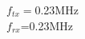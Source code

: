 \documentclass[preview]{standalone}
\begin{document}
\begin{center}
$f_{tx}=$0.23MHz\\$f_{rx}$=0.23MHz
\end{center}
\end{document}
